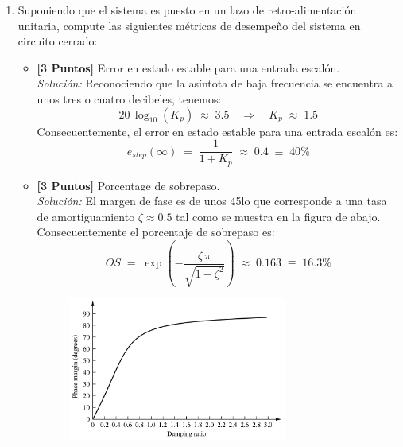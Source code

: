 \documentclass[ a4paper, twoside, 11pt]{article}
\begin{document}
\begin{problem}
\begin{enumerate}[label=\alph*.]
\begin{itemize}
\end{itemize}


\item Suponiendo que el sistema es puesto en un lazo de retro-alimentaci\'on unitaria, compute las siguientes m\'etricas de desempe\~no del sistema en circuito cerrado: 
\begin{itemize}
\item \textbf{[3 Puntos]} Error en estado estable para una entrada escal\'on. \\[1ex] \emph{Soluci\'on:} Reconociendo que la as\'intota de baja frecuencia se encuentra a unos tres o cuatro decibeles, tenemos: 
\[
20 \, \log_{10}( K_p ) \; \approx \; 3.5 \quad \Longrightarrow \quad
K_p \; \approx \; 1.5
\]
Consecuentemente, el error en estado estable para una entrada escal\'on es: 
\[
e_{step}(\infty) \; = \; \frac{1}{1 + K_p} \; \approx \; 0.4
\; \equiv \; 40\%
\]
\item \textbf{[3 Puntos]} Porcentage de sobrepaso. \\[1ex] \emph{Soluci\'on:} El margen de fase es de unos 45\deg lo que corresponde a una tasa de amortiguamiento $\zeta \approx 0.5$ tal como se muestra en la figura de abajo. Consecuentemente el porcentaje de sobrepaso es: 
\[
OS \; = \; \exp \left(
- \frac{ \zeta \, \pi}{ \sqrt{1 - \zeta^2}}
\right) \; \approx \; 0.163 \; \equiv \; 16.3\%
\]
\begin{figure}[htb]
\centering
\includegraphics[width=0.72\textwidth]{Fig_phase-damping.jpg}
\end{figure}

\end{itemize}
\end{enumerate}

\end{problem}
\vspace{\baselineskip}
\end{document}

